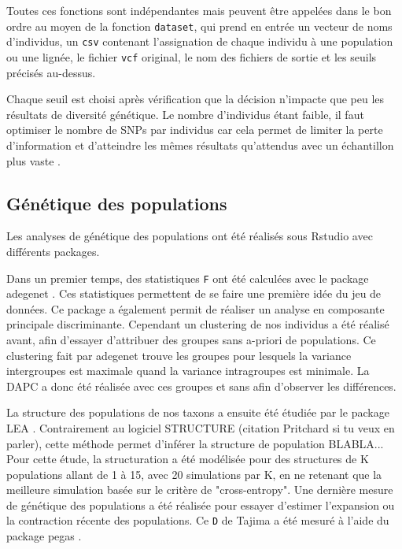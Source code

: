 Toutes ces fonctions sont indépendantes mais peuvent être appelées dans le bon ordre au moyen de la fonction \verb|dataset|, qui prend en entrée un vecteur de noms d'individus, un \verb|csv| contenant l'assignation de chaque individu à une population ou une lignée, le fichier \verb|vcf| original, le nom des fichiers de sortie et les seuils précisés au-dessus.

Chaque seuil est choisi après vérification que la décision n'impacte que peu les résultats de diversité génétique.
 Le nombre d'individus étant faible, il faut optimiser le nombre de SNPs par individus car cela permet de limiter la perte d'information et d'atteindre les mêmes résultats qu'attendus avec un échantillon plus vaste \citep{Nazareno2017}.


\subsection{Génétique des populations}

Les analyses de génétique des populations ont été réalisés sous Rstudio \citep{RTeam2017} avec différents packages. 

Dans un premier temps, des statistiques \verb|F| ont été calculées avec le package adegenet \citep{Jombart2011}. Ces statistiques permettent de se faire une première idée du jeu de données.
 Ce package a également permit de réaliser un analyse en composante principale discriminante.
 Cependant un clustering de nos individus a été réalisé avant, afin d'essayer d'attribuer des groupes sans a-priori de populations.
 Ce clustering fait par adegenet trouve les groupes pour lesquels la variance intergroupes est maximale quand la variance intragroupes est minimale.
 La DAPC a donc été réalisée avec ces groupes et sans afin d'observer les différences.

La structure des populations de nos taxons a ensuite été étudiée par le package LEA \citep{Frichot2015}.
Contrairement au logiciel STRUCTURE (citation Pritchard si tu veux en parler), cette méthode permet d'inférer la structure de population BLABLA...
 Pour cette étude, la structuration a été modélisée pour des structures de K populations allant de 1 à 15, avec 20 simulations par K, en ne retenant que la meilleure simulation basée sur le critère de "cross-entropy".
 Une dernière mesure de génétique des populations a été réalisée pour essayer d'estimer l’expansion ou la contraction récente des populations.
 Ce \verb|D| de Tajima a été mesuré à l'aide du package pegas \citep{Paradis2010}.

